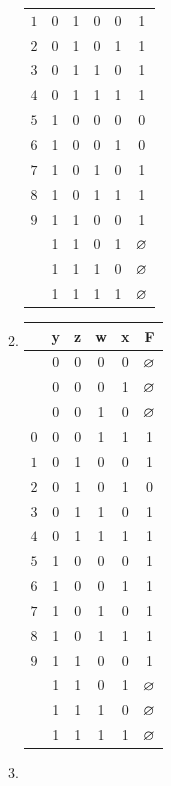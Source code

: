 \documentclass[]{../../../../tex/classes/homework}
\newcommand\DC{$\vn$}
\begin{document}
\begin{enumerate}
\begin{multicols}{3}
\begin{enumerate}
\begin{center}
\begin{tabular}{ c c c c c|c }
						$1$& 0 & 1 & 0 & 0 & 1 \\ 
						$2$& 0 & 1 & 0 & 1 & 1 \\ 
						$3$& 0 & 1 & 1 & 0 & 1 \\ 
						$4$& 0 & 1 & 1 & 1 & 1 \\ 
						$5$& 1 & 0 & 0 & 0 & 0 \\ 
						$6$& 1 & 0 & 0 & 1 & 0 \\ 
						$7$& 1 & 0 & 1 & 0 & 1 \\ 
						$8$& 1 & 0 & 1 & 1 & 1 \\
						$9$& 1 & 1 & 0 & 0 & 1 \\ 
						   & 1 & 1 & 0 & 1 & \DC \\ 
						   & 1 & 1 & 1 & 0 & \DC \\ 
						   & 1 & 1 & 1 & 1 & \DC
					\end{tabular}
				\end{center}
				\item \begin{center}
					\begin{tabular}{ c c c c c|c }
						\en{No.} & y & z & w & x & F \\
						\hline
						   & 0 & 0 & 0 & 0 & \DC \\ 
						   & 0 & 0 & 0 & 1 & \DC \\ 
						   & 0 & 0 & 1 & 0 & \DC \\ 
						$0$& 0 & 0 & 1 & 1 & 1 \\ 
						$1$& 0 & 1 & 0 & 0 & 1 \\ 
						$2$& 0 & 1 & 0 & 1 & 0 \\ 
						$3$& 0 & 1 & 1 & 0 & 1 \\ 
						$4$& 0 & 1 & 1 & 1 & 1 \\ 
						$5$& 1 & 0 & 0 & 0 & 1 \\ 
						$6$& 1 & 0 & 0 & 1 & 1 \\ 
						$7$& 1 & 0 & 1 & 0 & 1 \\ 
						$8$& 1 & 0 & 1 & 1 & 1 \\
						$9$& 1 & 1 & 0 & 0 & 1 \\ 
						   & 1 & 1 & 0 & 1 & \DC \\ 
						   & 1 & 1 & 1 & 0 & \DC \\ 
						   & 1 & 1 & 1 & 1 & \DC
					\end{tabular}
				\end{center}
				\item \begin{center}
					\begin{tabular}{ c c c c c|c }

\end{tabular}
\end{center}
\end{enumerate}
\end{multicols}
\end{enumerate}
\end{document}
